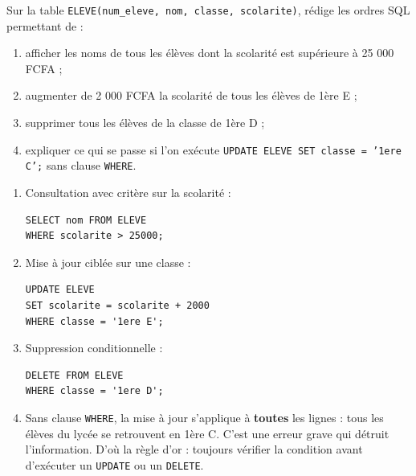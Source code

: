\documentclass[11pt]{article}
\begin{document}
\begin{exercice}
Sur la table \texttt{ELEVE(\texttt{num\_eleve}, \texttt{nom}, \texttt{classe}, \texttt{scolarite})}, rédige les ordres SQL permettant de :
\begin{enumerate}
\item afficher les noms de tous les élèves dont la scolarité est supérieure à 25 000 FCFA ;
\item augmenter de 2 000 FCFA la scolarité de tous les élèves de 1ère E ;
\item supprimer tous les élèves de la classe de 1ère D ;
\item expliquer ce qui se passe si l'on exécute \texttt{UPDATE ELEVE SET classe = '1ere C';} sans clause \texttt{WHERE}.
\end{enumerate}
\end{exercice}

\begin{corrige}[Exercice]
\begin{enumerate}
\item Consultation avec critère sur la scolarité :
\begin{lstlisting}
SELECT nom FROM ELEVE
WHERE scolarite > 25000;
\end{lstlisting}
\item Mise à jour ciblée sur une classe :
\begin{lstlisting}
UPDATE ELEVE
SET scolarite = scolarite + 2000
WHERE classe = '1ere E';
\end{lstlisting}
\item Suppression conditionnelle :
\begin{lstlisting}
DELETE FROM ELEVE
WHERE classe = '1ere D';
\end{lstlisting}
\item Sans clause \texttt{WHERE}, la mise à jour s'applique à \textbf{toutes} les lignes : tous les élèves du lycée se retrouvent en 1ère C. C'est une erreur grave qui détruit l'information. D'où la règle d'or : toujours vérifier la condition avant d'exécuter un \texttt{UPDATE} ou un \texttt{DELETE}.
\end{enumerate}
\end{corrige}
\end{document}
